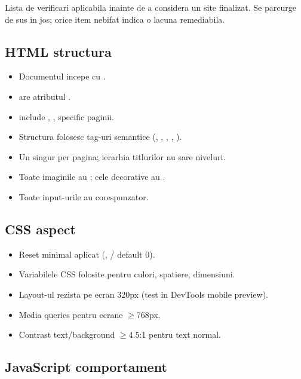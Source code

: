 Lista de verificari aplicabila inainte de a considera un site finalizat. Se parcurge de sus in jos; orice item nebifat indica o lacuna remediabila.

\subsection*{HTML \textendash{} structura}

\begin{itemize}[leftmargin=*, label={$\square$}, itemsep=2pt]
  \item Documentul incepe cu .
  \item {} are atributul .
  \item {} include , ,  specific paginii.
  \item Structura folosesc tag-uri semantice (, , , , ).
  \item Un singur  per pagina; ierarhia titlurilor nu sare niveluri.
  \item Toate imaginile au ; cele decorative au .
  \item Toate input-urile au  corespunzator.
\end{itemize}

\subsection*{CSS \textendash{} aspect}

\begin{itemize}[leftmargin=*, label={$\square$}, itemsep=2pt]
  \item Reset minimal aplicat (, / default 0).
  \item Variabilele CSS folosite pentru culori, spatiere, dimensiuni.
  \item Layout-ul rezista pe ecran 320px (test in DevTools \textendash{} mobile preview).
  \item Media queries pentru ecrane $\geq$768px.
  \item Contrast text/background $\geq$4.5:1 pentru text normal.
\end{itemize}

\subsection*{JavaScript \textendash{} comportament}

